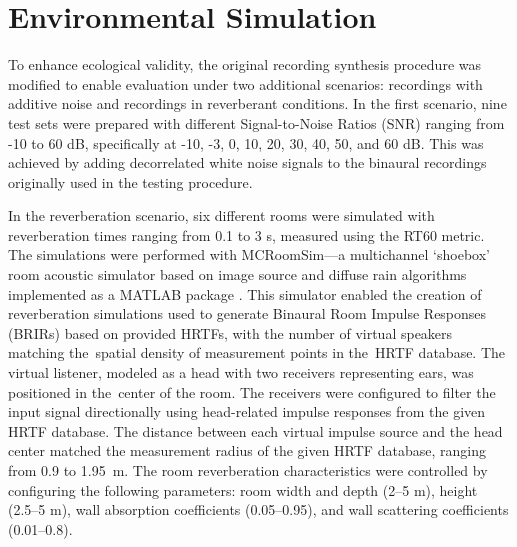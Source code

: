 \section{Environmental Simulation}
\label{sec:environmental}

To enhance ecological validity, the original recording synthesis procedure was modified to enable evaluation under two additional scenarios: recordings with additive noise and recordings in reverberant conditions. In the first scenario, nine test sets were prepared with different Signal-to-Noise Ratios (SNR) ranging from -10 to 60 dB, specifically at -10, -3, 0, 10, 20, 30, 40, 50, and 60 dB. This was achieved by adding decorrelated white noise signals to the binaural recordings originally used in the testing procedure.

In the reverberation scenario, six different rooms were simulated with reverberation times ranging from 0.1 to 3 s, measured using the RT60 metric. The simulations were performed with MCRoomSim—a multichannel `shoebox' room acoustic simulator based on image source and diffuse rain algorithms implemented as a MATLAB package \cite{wabnitz_room_2010}. This simulator enabled the creation of reverberation simulations used to generate Binaural Room Impulse Responses (BRIRs) based on provided HRTFs, with the number of virtual speakers matching the~spatial density of measurement points in the~HRTF database. The virtual listener, modeled as a head with two receivers representing ears, was positioned in the~center of the room. The receivers were configured to filter the input signal directionally using head-related impulse responses from the given HRTF database. The distance between each virtual impulse source and the head center matched the measurement radius of the given HRTF database, ranging from 0.9 to 1.95~m. The room reverberation characteristics were controlled by configuring the following parameters: room width and depth (2--5 m), height (2.5--5 m), wall absorption coefficients (0.05--0.95), and wall scattering coefficients (0.01--0.8).
